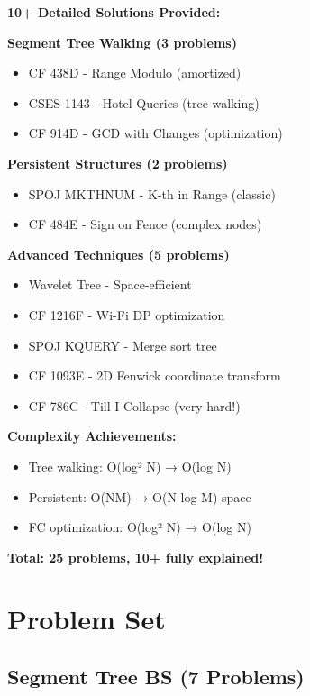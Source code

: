 \documentclass[11pt,a4paper,oneside]{book}
\begin{document}
\begin{tcolorbox}[
    enhanced,breakable,
    colback=primaryblue!10,
    colframe=primaryblue,
    boxrule=2pt,
    arc=4mm,
    title=\textbf{BS with Data Structures: Complete Mastery}
]
\textbf{10+ Detailed Solutions Provided:}

\textbf{Segment Tree Walking (3 problems)}
\begin{itemize}
\item CF 438D - Range Modulo (amortized)
\item CSES 1143 - Hotel Queries (tree walking)
\item CF 914D - GCD with Changes (optimization)
\end{itemize}

\textbf{Persistent Structures (2 problems)}
\begin{itemize}
\item SPOJ MKTHNUM - K-th in Range (classic)
\item CF 484E - Sign on Fence (complex nodes)
\end{itemize}

\textbf{Advanced Techniques (5 problems)}
\begin{itemize}
\item Wavelet Tree - Space-efficient
\item CF 1216F - Wi-Fi DP optimization
\item SPOJ KQUERY - Merge sort tree
\item CF 1093E - 2D Fenwick coordinate transform
\item CF 786C - Till I Collapse (very hard!)
\end{itemize}

\textbf{Complexity Achievements:}
\begin{itemize}
\item Tree walking: O(log² N) → O(log N)
\item Persistent: O(NM) → O(N log M) space
\item FC optimization: O(log² N) → O(log N)
\end{itemize}

\textbf{Total: 25 problems, 10+ fully explained!}
\end{tcolorbox}


\section{Problem Set}

\subsection{Segment Tree BS (7 Problems)}
\end{document}
